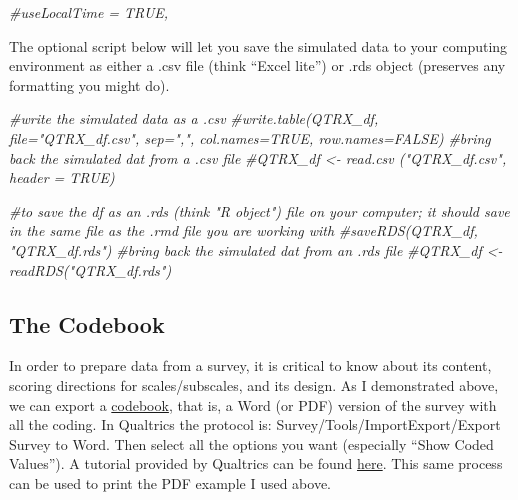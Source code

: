 \documentclass[
  english,
]{book}
\newenvironment{Shaded}{\begin{snugshade}}{\end{snugshade}}
\newcommand{\CommentTok}[1]{\textcolor[rgb]{0.56,0.35,0.01}{\textit{#1}}}
\begin{document}
\begin{Shaded}
\begin{Highlighting}[]
\CommentTok{\#useLocalTime = TRUE,}
\end{Highlighting}
\end{Shaded}

The optional script below will let you save the simulated data to your computing environment as either a .csv file (think ``Excel lite'') or .rds object (preserves any formatting you might do).

\begin{Shaded}
\begin{Highlighting}[]
\CommentTok{\#write the simulated data  as a .csv}
\CommentTok{\#write.table(QTRX\_df, file="QTRX\_df.csv", sep=",", col.names=TRUE, row.names=FALSE)}
\CommentTok{\#bring back the simulated dat from a .csv file}
\CommentTok{\#QTRX\_df \textless{}{-} read.csv ("QTRX\_df.csv", header = TRUE)}
\end{Highlighting}
\end{Shaded}

\begin{Shaded}
\begin{Highlighting}[]
\CommentTok{\#to save the df as an .rds (think "R object") file on your computer; it should save in the same file as the .rmd file you are working with}
\CommentTok{\#saveRDS(QTRX\_df, "QTRX\_df.rds")}
\CommentTok{\#bring back the simulated dat from an .rds file}
\CommentTok{\#QTRX\_df \textless{}{-} readRDS("QTRX\_df.rds")}
\end{Highlighting}
\end{Shaded}

\hypertarget{the-codebook}{%
\subsection{The Codebook}\label{the-codebook}}

In order to prepare data from a survey, it is critical to know about its content, scoring directions for scales/subscales, and its design. As I demonstrated above, we can export a \href{./Rate-a-Course_Codebook.pdf}{codebook}, that is, a Word (or PDF) version of the survey with all the coding. In Qualtrics the protocol is: Survey/Tools/ImportExport/Export Survey to Word. Then select all the options you want (especially ``Show Coded Values''). A tutorial provided by Qualtrics can be found \href{https://www.qualtrics.com/support/survey-platform/survey-module/survey-tools/import-and-export-surveys/}{here}. This same process can be used to print the PDF example I used above.
\end{document}
